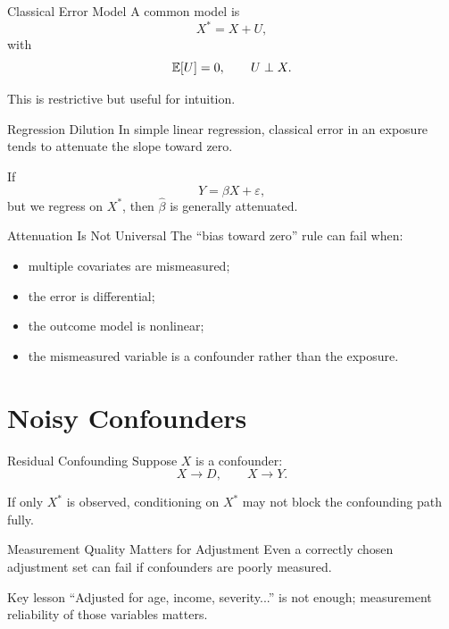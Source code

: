 \documentclass[aspectratio=169,11pt]{beamer}
\begin{document}
\begin{frame}{Classical Error Model}
A common model is
\[
X^\ast = X + U,
\]
with
\[
\mathbb{E}[U]=0,
\qquad
U \perp X.
\]

This is restrictive but useful for intuition.
\end{frame}

\begin{frame}{Regression Dilution}
In simple linear regression, classical error in an exposure tends to attenuate the slope toward zero.

If
\[
Y=\beta X+\varepsilon,
\]
but we regress on \(X^\ast\), then \(\widehat\beta\) is generally attenuated.
\end{frame}

\begin{frame}{Attenuation Is Not Universal}
The “bias toward zero” rule can fail when:
\begin{itemize}
\item multiple covariates are mismeasured;
\item the error is differential;
\item the outcome model is nonlinear;
\item the mismeasured variable is a confounder rather than the exposure.
\end{itemize}
\end{frame}

\section{Noisy Confounders}

\begin{frame}{Residual Confounding}
Suppose \(X\) is a confounder:
\[
X \rightarrow D,
\qquad
X \rightarrow Y.
\]

If only \(X^\ast\) is observed, conditioning on \(X^\ast\) may not block the confounding path fully.
\end{frame}

\begin{frame}{Measurement Quality Matters for Adjustment}
Even a correctly chosen adjustment set can fail if confounders are poorly measured.

\begin{alertblock}{Key lesson}
“Adjusted for age, income, severity...” is not enough; measurement reliability of those variables matters.
\end{alertblock}
\end{frame}
\end{document}

